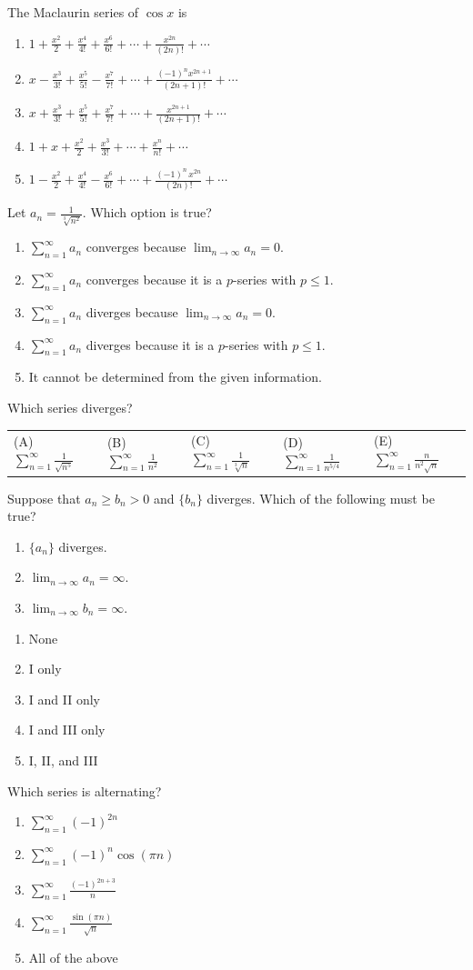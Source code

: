 \documentclass[letterstyle,12pt]{extarticle}
\newcounter{qcounter}
\newcommand{\choices}[5]{
\vspace{0.8em} 
\begin{enumerate}[label=(\Alph*)]
\setlength\itemsep{1em} 
\item
#1 
\item 
#2
\item
#3
\item
#4
\item
#5
\end{enumerate}
}
\newcommand{\choicesline}[5]{    
\vspace{2em} \break 
\begin{tabularx}{0.95 \textwidth} { 
>{\arraybackslash}X 
>{\arraybackslash}X 
>{\arraybackslash}X 
>{\arraybackslash}X 
>{\arraybackslash}X }
(A) \; #1
& 
(B) \; #2
& 
(C) \; #3
& 
(D) \; #4
&
(E) \; #5 
\end{tabularx}
\vspace{2em} \break
}
\newcommand{\ans}[1]{{\color{black} #1}}
\newenvironment{question}
    {\begin{minipage}{0.9 \textwidth}
        \item
    }
    { 
    \end{minipage} \vspace{4ex}
    }
\newcommand{\romanlist}[1]{\begin{enumerate}[label=\Roman*., leftmargin=15mm] #1 \end{enumerate}}
\begin{document}
\begin{list}{\textbf{.}~}{}
\begin{question}
The Maclaurin series of \(\cos x\) is 
\choices
{\(1 + \frac{x^2}{2} + \frac{x^4}{4!} + \frac{x^6}{6!} + \cdots + \frac{x^{2n}}{(2n)!} + \cdots\)}
{\(x - \frac{x^3}{3!} + \frac{x^5}{5!} - \frac{x^7}{7!} + \cdots + \frac{(-1)^n x^{2n + 1}}{(2n + 1)!} + \cdots\)}
{\(x + \frac{x^3}{3!} + \frac{x^5}{5!} + \frac{x^7}{7!} + \cdots + \frac{x^{2n + 1}}{(2n + 1)!} + \cdots\)}
{\(1 + x + \frac{x^2}{2} + \frac{x^3}{3!} + \cdots + \frac{x^n}{n!} + \cdots\)}
{\ans{\(1 - \frac{x^2}{2} + \frac{x^4}{4!} - \frac{x^6}{6!} + \cdots + \frac{(-1)^n \, x^{2n}}{(2n)!} + \cdots\)}}
\end{question}


\begin{question}
Let \(a_n = \frac{1}{\sqrt[3]{n^2}}.\) Which option is true? 
\choices
{\(\sum_{n = 1}^\infty a_n\) converges because \(\lim_{n \to \infty} a_n = 0.\)}
{\(\sum_{n = 1}^\infty a_n\) converges because it is a \(p\)-series with \(p \leqslant 1.\)}
{\(\sum_{n = 1}^\infty a_n\) diverges because \(\lim_{n \to \infty} a_n = 0.\)}
{\ans{\(\sum_{n = 1}^\infty a_n\) diverges because it is a \(p\)-series with \(p \leqslant 1.\)}}
{It cannot be determined from the given information.}
\end{question}

\begin{question}
Which series diverges?
\choicesline
{\(\sum_{n = 1}^\infty \frac{1}{\sqrt{n^5}}\)}
{\(\sum_{n = 1}^\infty \frac{1}{n^2}\)}
{\ans{\(\sum_{n = 1}^\infty \frac{1}{\sqrt[3]{n}}\)}}
{\(\sum_{n = 1}^\infty \frac{1}{n^{5/4}}\)}
{\(\sum_{n = 1}^\infty \frac{n}{n^2 \sqrt n}\)}
\end{question}

\begin{question}
Suppose that \(a_n \geqslant b_n > 0\) and \(\{b_n\}\) diverges. Which of the following must be true?

\romanlist{
\item
\(\{a_n\}\) diverges.
\item 
\(\lim_{n \to \infty} a_n = \infty.\)
\item
\(\lim_{n \to \infty} b_n = \infty.\)
}

\choices
{\ans{None}}
{I only}
{I and II only}
{I and III only}
{I, II, and III}
\end{question}

\begin{question}
Which series is alternating?
\choices
{\(\sum_{n = 1}^\infty (-1)^{2n}\)}
{\(\sum_{n = 1}^\infty (-1)^n \cos(\pi n)\)}
{\(\sum_{n = 1}^\infty \frac{(-1)^{2n + 3}}{n}\)}
{\ans{\(\sum_{n = 1}^\infty \frac{\sin(\pi n)}{\sqrt n}\)}}
{All of the above}
\end{question}


\end{list}
\end{document}
